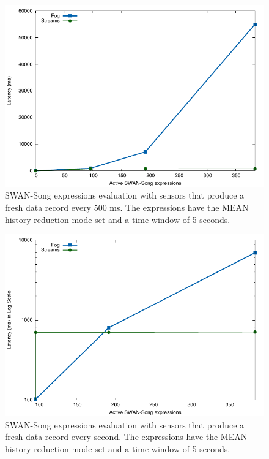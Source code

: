  \begin{figure}[h!]
\includegraphics[width=1\textwidth]{images/0_5.pdf}
 \caption{SWAN-Song expressions evaluation with sensors that produce a fresh data record every 500 ms. The expressions have the MEAN history reduction mode set and a time window of 5 seconds.}
\label{fig:0_5}
\end{figure}

 \begin{figure}[h!]
\includegraphics[width=1\textwidth]{images/1_0.pdf}
 \caption{SWAN-Song expressions evaluation with sensors that produce a fresh data record every second. The expressions have the MEAN history reduction mode set and a time window of 5 seconds.}
\label{fig:1_0}
\end{figure}

